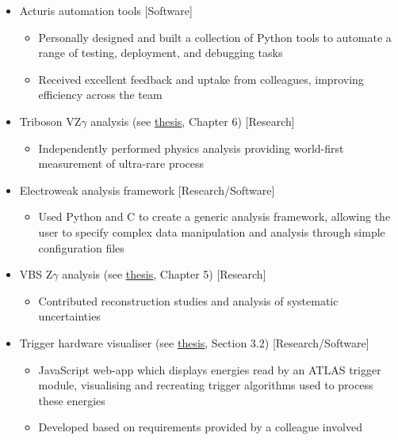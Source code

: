 \documentclass[a4paper]{article}
\newcommand\bodysize{\fontsize{11}{13}}
\newcommand\link[2]{{\color{hl}\uline{\href{#1}{#2}}}}
\newcommand\cpp{{C\nolinebreak[4]\hspace{-.05em}\raisebox{.45ex}{\relsize{-3}\bf+\hspace{-.08em}+}}\xspace}
\newcommand\sidetitle[2][0em]{%
  \fontfamily{phv}\fontseries{b}\fontsize{12}{13}\selectfont\color{hl}
  \hspace{.1em}
  \rotatebox[origin=c]{90}{\hspace{#1}#2}
}
\newcommand\lefttitleblockvpad{\vspace{.3em}}
\newcommand\lefttitleblock[3]{%
  \colorbox{#1}{%
    \begin{minipage}[c]{.04\textwidth}
      \lefttitleblockvpad
      \sidetitle{#2}
      \lefttitleblockvpad
    \end{minipage}{\color{hl}\vrule width 1pt}%
    \begin{minipage}[c]{.005\textwidth}\hfill\end{minipage}
    \begin{minipage}[c]{.94\textwidth}
      \lefttitleblockvpad
      #3
      \lefttitleblockvpad
    \end{minipage}%
  }
}
\newcommand\thesislink[1]{https://raw.githubusercontent.com/Hazza4569/thesis/refs/heads/master/thesis.pdf\#page=#1}
\newcommand\seethesis[3][Chapter]{(see \link{\thesislink{#3}}{thesis}, #1 #2)}
\begin{document}
\lefttitleblock{bg1}{PROJECTS}{%
    \fontseries{m}\fontshape{n}\bodysize\selectfont%
    \begin{itemize}
      \setlength\itemsep{.2em}
      \item Acturis automation tools
        \hfill{\color{hl}[Software]}
      \begin{itemize}
        \item Personally designed and built a collection of Python tools to automate
          a range of testing, deployment, and debugging tasks
        \item Received excellent feedback and uptake from colleagues, improving
          efficiency across the team
      \end{itemize}
      \item Triboson VZ$\gamma$ analysis \seethesis{6}{150}
        \hfill{\color{hl}[Research]}
      \begin{itemize}
        \item Independently performed physics analysis providing world-first
          measurement of ultra-rare process
      \end{itemize}
      \item Electroweak analysis framework
        \hfill{\color{hl}[Research/Software]}
      \begin{itemize}
        \item Used Python and \cpp to create a generic analysis framework,
          allowing the user to specify complex data manipulation and analysis
          through simple configuration files
      \end{itemize}
      \item VBS Z$\gamma$ analysis \seethesis{5}{127}
        \hfill{\color{hl}[Research]}
      \begin{itemize}
        \item Contributed reconstruction studies and analysis of systematic
          uncertainties
      \end{itemize}
      \item Trigger hardware visualiser \seethesis[Section]{3.2}{68}
        \hfill{\color{hl}[Research/Software]}
      \begin{itemize}
        \item JavaScript web-app which displays energies read by an ATLAS
          trigger module, visualising and recreating trigger algorithms used
          to process these energies
        \item Developed based on requirements provided by a colleague involved

\end{itemize}
\end{itemize}}
\end{document}

